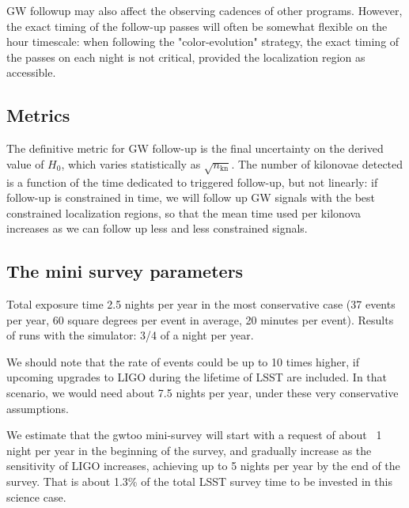 GW followup may also affect the observing cadences of other programs. However, the exact timing of the follow-up passes will often be somewhat flexible on the hour timescale: when following the "color-evolution" strategy, the exact timing of the passes on each night is not critical, provided the localization region as accessible.


\subsection{Metrics}

The definitive metric for GW follow-up is the final uncertainty on the derived value of $H_0$, which varies statistically as $\sqrt{n_{\mbox{kn}}}$. The number of kilonovae detected is a function of the time dedicated to triggered follow-up, but not linearly: if follow-up is constrained in time, we will follow up GW signals with the best constrained localization regions, so that the mean time used per kilonova increases as we can follow up less and less constrained signals.




\subsection{The mini survey parameters}

Total exposure time 2.5 nights per year in the most conservative case (37 events per year, 60 square degrees per event in average, 20 minutes per event). 
Results of runs with the simulator: 3/4 of a night per year.

We should note that the rate of events could be up to 10 times higher, if upcoming upgrades to LIGO during the lifetime of LSST are included. In that scenario, we would need about 7.5 nights per year, under these very conservative assumptions.

We estimate that the gwtoo mini-survey will start with a request of about ~1 night per year in the beginning of the survey, and gradually increase as the sensitivity of LIGO increases, achieving  up to 5 nights per year by the end of the survey. That is about 1.3\% of the total LSST survey time to be invested in this science case. 
